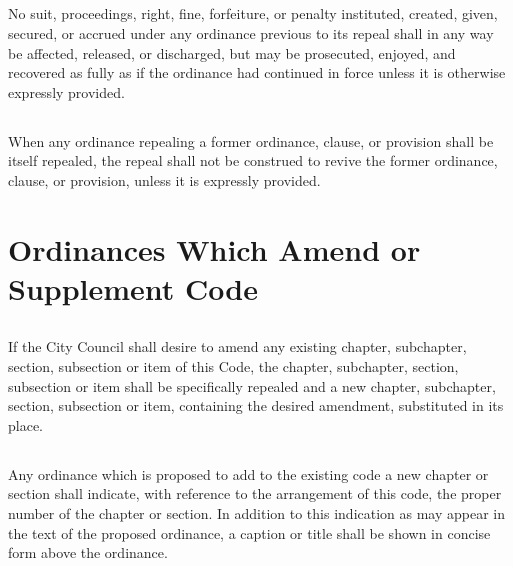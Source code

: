 \subsection{}
No suit, proceedings, right, fine, forfeiture, or penalty instituted, created, given, secured, or accrued under any ordinance previous to its repeal shall in any way be affected, released, or discharged, but may be prosecuted, enjoyed, and recovered as fully as if the ordinance had continued in force unless it is otherwise expressly provided.
\subsection{}
When any ordinance repealing a former ordinance, clause, or provision shall be itself repealed, the repeal shall not be construed to revive the former ordinance, clause, or provision, unless it is expressly provided.



\section{Ordinances Which Amend or Supplement Code}
\subsection{}
If the City Council shall desire to amend any existing chapter, subchapter, section, subsection or item of this Code, the chapter, subchapter, section, subsection or item shall be specifically repealed and a new chapter, subchapter, section, subsection or item, containing the desired amendment, substituted in its place.
\subsection{}
Any ordinance which is proposed to add to the existing code a new chapter or section shall indicate, with reference to the arrangement of this code, the proper number of the chapter or section. In addition to this indication as may appear in the text of the proposed ordinance, a caption or title shall be shown in concise form above the ordinance.



